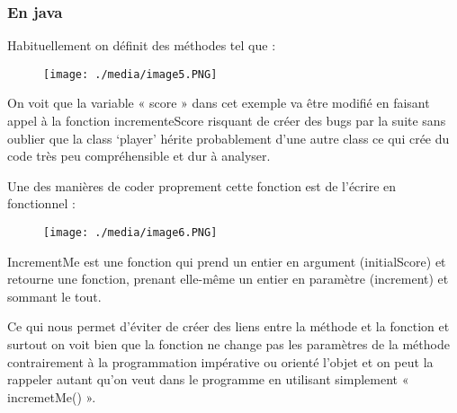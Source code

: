 \documentclass[12pt]{article}
\begin{document}
\subsubsection*{En java }
Habituellement on définit des méthodes tel que :\par




\begin{figure}[H]
	\begin{Center}
		\texttt{[image: ./media/image5.PNG]}
	\end{Center}
\end{figure}



\par

On voit que la variable « score » dans cet exemple va être modifié en faisant appel à la fonction incrementeScore risquant de créer des bugs par la suite sans oublier que la class ‘player’ hérite probablement d’une autre class ce qui crée du code très peu compréhensible et dur à analyser. \par

Une des manières de coder proprement cette fonction est de l’écrire en fonctionnel :\par




\begin{figure}[H]
	\begin{Center}
		\texttt{[image: ./media/image6.PNG]}
	\end{Center}
\end{figure}



\par

IncrementMe est une fonction qui prend un entier en argument (initialScore) et retourne une fonction, prenant elle-même un entier en paramètre (increment) et sommant le tout.\par

Ce qui nous permet d’éviter de créer des liens entre la méthode et la fonction et surtout on voit bien que la fonction ne change pas les paramètres de la méthode contrairement à la programmation impérative ou orienté l’objet et on peut la rappeler autant qu’on veut dans le programme en utilisant simplement « incremetMe() ».\par
\end{document}
